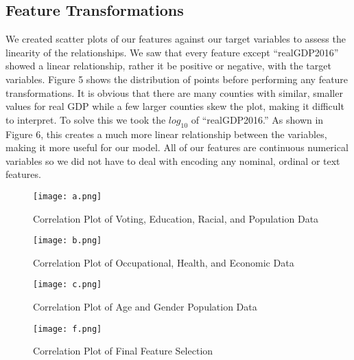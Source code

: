 \documentclass[letterpaper, twocolumn]{article}
\begin{document}
\subsection{Feature Transformations}

We created scatter plots of our features against our target variables to assess the linearity of the relationships. We saw that every feature except “realGDP2016” showed a linear relationship, rather it be positive or negative, with the target variables. Figure 5 shows the distribution of points before performing any feature transformations. It is obvious that there are many counties with similar, smaller values for real GDP while a few larger counties skew the plot, making it difficult to interpret. To solve this we took the $log_{10}$ of “realGDP2016.” As shown in Figure 6, this creates a much more linear relationship between the variables, making it more useful for our model. All of our features are continuous numerical variables so we did not have to deal with encoding any nominal, ordinal or text features. 



\begin{figure}[htbp]
    \centering
    \texttt{[image: a.png]}
    \caption{Correlation Plot of Voting, Education, Racial, and Population Data}
    \label{fig:arstmade}
\end{figure}

\begin{figure}[htbp]
    \centering
    \texttt{[image: b.png]}
    \caption{Correlation Plot of Occupational, Health, and Economic Data}
    \label{fig:arstmade}
\end{figure}

\begin{figure}[htbp]
    \centering
    \texttt{[image: c.png]}
    \caption{Correlation Plot of Age and Gender Population Data}
    \label{fig:arstmade}
\end{figure}

\begin{figure}[htbp]
    \centering
    \texttt{[image: f.png]}
    \caption{Correlation Plot of Final Feature Selection}
    \label{fig:arstmade}
\end{figure}
\end{document}
